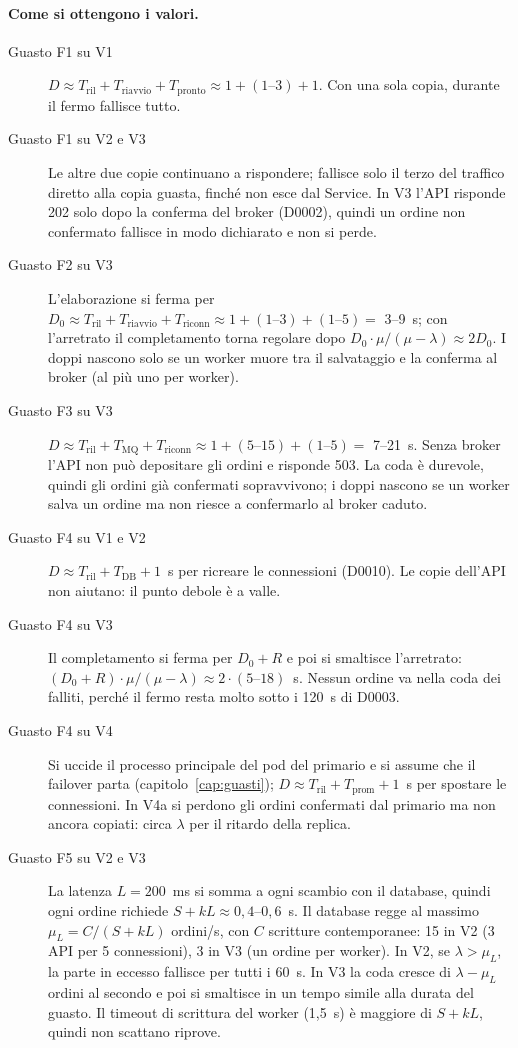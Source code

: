 \paragraph{Come si ottengono i valori.}
\begin{description}
  \item[Guasto F1 su V1] $D \approx T_{\text{ril}} + T_{\text{riavvio}} + T_{\text{pronto}} \approx 1 + (1\text{--}3) + 1$. Con una sola copia, durante il fermo fallisce tutto.
  \item[Guasto F1 su V2 e V3] Le altre due copie continuano a rispondere; fallisce solo il terzo del traffico diretto alla copia guasta, finché non esce dal Service. In V3 l'API risponde 202 solo dopo la conferma del broker (D0002), quindi un ordine non confermato fallisce in modo dichiarato e non si perde.
  \item[Guasto F2 su V3] L'elaborazione si ferma per $D_0 \approx T_{\text{ril}} + T_{\text{riavvio}} + T_{\text{riconn}} \approx 1 + (1\text{--}3) + (1\text{--}5) =$ 3--9~s; con l'arretrato il completamento torna regolare dopo $D_0 \cdot \mu/(\mu - \lambda) \approx 2 D_0$. I doppi nascono solo se un worker muore tra il salvataggio e la conferma al broker (al più uno per worker).
  \item[Guasto F3 su V3] $D \approx T_{\text{ril}} + T_{\text{MQ}} + T_{\text{riconn}} \approx 1 + (5\text{--}15) + (1\text{--}5) =$ 7--21~s. Senza broker l'API non può depositare gli ordini e risponde 503. La coda è durevole, quindi gli ordini già confermati sopravvivono; i doppi nascono se un worker salva un ordine ma non riesce a confermarlo al broker caduto.
  \item[Guasto F4 su V1 e V2] $D \approx T_{\text{ril}} + T_{\text{DB}} + 1$~s per ricreare le connessioni (D0010). Le copie dell'API non aiutano: il punto debole è a valle.
  \item[Guasto F4 su V3] Il completamento si ferma per $D_0 + R$ e poi si smaltisce l'arretrato: $(D_0 + R) \cdot \mu/(\mu - \lambda) \approx 2 \cdot (5\text{--}18)$~s. Nessun ordine va nella coda dei falliti, perché il fermo resta molto sotto i 120~s di D0003.
  \item[Guasto F4 su V4] Si uccide il processo principale del pod del primario e si assume che il failover parta (capitolo~\ref{cap:guasti}); $D \approx T_{\text{ril}} + T_{\text{prom}} + 1$~s per spostare le connessioni. In V4a si perdono gli ordini confermati dal primario ma non ancora copiati: circa $\lambda$ per il ritardo della replica.
  \item[Guasto F5 su V2 e V3] La latenza $L = 200$~ms si somma a ogni scambio con il database, quindi ogni ordine richiede $S + kL \approx 0{,}4$--$0{,}6$~s. Il database regge al massimo $\mu_L = C / (S + kL)$ ordini/s, con $C$ scritture contemporanee: 15 in V2 (3 API per 5 connessioni), 3 in V3 (un ordine per worker). In V2, se $\lambda > \mu_L$, la parte in eccesso fallisce per tutti i 60~s. In V3 la coda cresce di $\lambda - \mu_L$ ordini al secondo e poi si smaltisce in un tempo simile alla durata del guasto. Il timeout di scrittura del worker (1,5~s) è maggiore di $S + kL$, quindi non scattano riprove.

\end{description}
